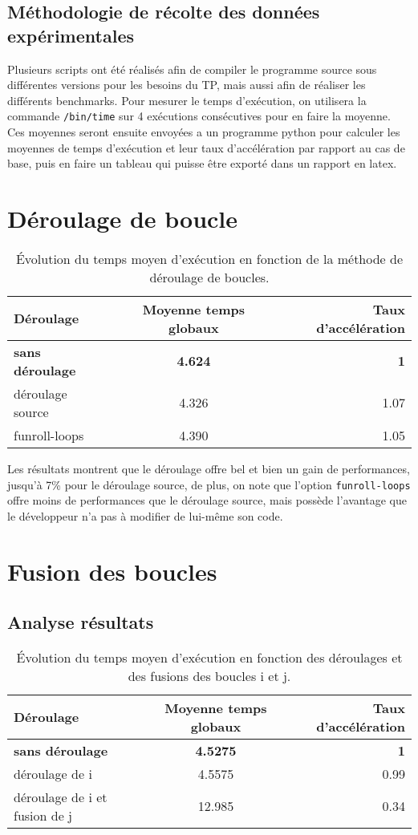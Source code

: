 \documentclass{rapport}
\begin{document}
    \subsection*{Méthodologie de récolte des données expérimentales}
    
    Plusieurs scripts ont été réalisés afin de compiler le programme source sous différentes versions pour les besoins du TP, mais aussi afin de réaliser les différents benchmarks.
    \newline Pour mesurer le temps d'exécution, on utilisera la commande \texttt{/bin/time} sur 4 exécutions consécutives pour en faire la moyenne.
    \newline Ces moyennes seront ensuite envoyées a un programme python pour calculer les moyennes de temps d'exécution et leur taux d'accélération par rapport au cas de base, puis en faire un tableau qui puisse être exporté dans un rapport en latex.


\section{Déroulage de boucle}
\begin{table}[H]
  \centering
  \begin{tabular}{ l|c|r }
    Déroulage & Moyenne temps globaux & Taux d'accélération \\
    \hline
    \textbf{sans déroulage} & \textbf{4.624} & \textbf{1} \\
    déroulage source & 4.326 & 1.07 \\
    funroll-loops & 4.390 & 1.05
  \end{tabular}
  \caption{Évolution du temps moyen d'exécution en fonction de la méthode de déroulage de boucles.}
\end{table}
Les résultats montrent que le déroulage offre bel et bien un gain de performances, jusqu’à 7\% pour le déroulage source, de plus, on note que l'option \texttt{funroll-loops} offre moins de performances que le déroulage source, mais possède l'avantage que le développeur n'a pas à modifier de lui-même son code.

\section{Fusion des boucles}

\subsection{Analyse résultats}
\begin{table}[H]
  \centering
  \begin{tabular}{ l|c|r }
    Déroulage & Moyenne temps globaux & Taux d'accélération \\
    \hline
    \textbf{sans déroulage} & \textbf{ 4.5275 } & \textbf{1} \\
    déroulage de i & 4.5575 & 0.99 \\
    déroulage de i et fusion de j & 12.985 & 0.34 \\
  \end{tabular}
  \caption{Évolution du temps moyen d'exécution en fonction des déroulages et des fusions des boucles i et j.}
\end{table}
\end{document}
